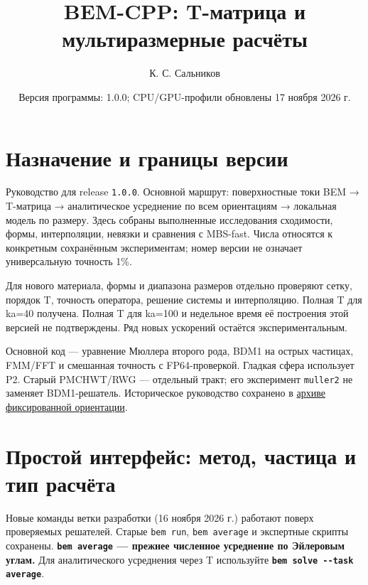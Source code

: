 \documentclass[
  russian,
  11pt,
  a4paper,
]{report}
\title{BEM-CPP: T-матрица и мультиразмерные расчёты}
\author{К. С. Сальников}
\date{Версия программы: 1.0.0; CPU/GPU-профили обновлены 17 ноября 2026
г.}
\begin{document}
\maketitle

{
\setcounter{tocdepth}{1}
\tableofcontents
}
\chapter{Назначение и границы
версии}\label{ux43dux430ux437ux43dux430ux447ux435ux43dux438ux435-ux438-ux433ux440ux430ux43dux438ux446ux44b-ux432ux435ux440ux441ux438ux438}

Руководство для release \nolinkurl{1.0.0}. Основной маршрут:
поверхностные токи BEM → T-матрица → аналитическое усреднение по всем
ориентациям → локальная модель по размеру. Здесь собраны выполненные
исследования сходимости, формы, интерполяции, невязки и сравнения с
MBS-fast. Числа относятся к конкретным сохранённым экспериментам; номер
версии не означает универсальную точность 1\%.

Для нового материала, формы и диапазона размеров отдельно проверяют
сетку, порядок T, точность оператора, решение системы и интерполяцию.
Полная T для ka=40 получена. Полная T для ka=100 и недельное время её
построения этой версией не подтверждены. Ряд новых ускорений остаётся
экспериментальным.

Основной код --- уравнение Мюллера второго рода, BDM1 на острых
частицах, FMM/FFT и смешанная точность с FP64-проверкой. Гладкая сфера
использует P2. Старый PMCHWT/RWG --- отдельный тракт; его эксперимент
\nolinkurl{muller2} не заменяет BDM1-решатель. Историческое руководство
сохранено в \href{docs/legacy_fixed_orientation_manual.md}{архиве
фиксированной ориентации}.

\chapter{Простой интерфейс: метод, частица и тип
расчёта}\label{ux43fux440ux43eux441ux442ux43eux439-ux438ux43dux442ux435ux440ux444ux435ux439ux441-ux43cux435ux442ux43eux434-ux447ux430ux441ux442ux438ux446ux430-ux438-ux442ux438ux43f-ux440ux430ux441ux447ux451ux442ux430}

Новые команды ветки разработки (16 ноября 2026 г.) работают поверх
проверяемых решателей. Старые \nolinkurl{bem run},
\nolinkurl{bem average} и экспертные скрипты сохранены.
\textbf{\nolinkurl{bem average} --- прежнее численное усреднение по
Эйлеровым углам.} Для аналитического усреднения через T используйте
\textbf{\nolinkurl{bem solve --task average}}.
\end{document}
